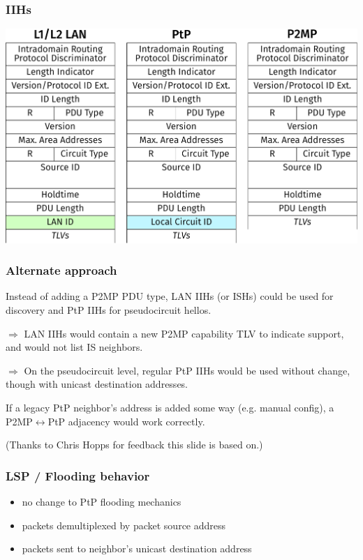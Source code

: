 \documentclass[12pt]{beamer}
\begin{document}
\begin{frame}
  \frametitle{IIHs}

  \includegraphics[scale=0.42,angle=0]{isis_93_p2mppdu.pdf}%
\end{frame}

\begin{frame}
  \frametitle{Alternate approach}

  Instead of adding a P2MP PDU type, LAN IIHs (or ISHs) could be used for
  discovery and PtP IIHs for pseudocircuit hellos.

  \vspace{3mm}

  $\Rightarrow$ LAN IIHs would contain a new P2MP capability TLV to indicate
  support, and would not list IS neighbors.

  \vspace{3mm}

  $\Rightarrow$ On the pseudocircuit level, regular PtP IIHs would be used
  without change, though with unicast destination addresses.

  \vspace{3mm}

  If a legacy PtP neighbor's address is added some way (e.g.
  manual config), a P2MP$\leftrightarrow$PtP adjacency would work correctly.

  \vspace{3mm}

  (Thanks to Chris Hopps for feedback this slide is based on.)

\end{frame}

\begin{frame}
  \frametitle{LSP / Flooding behavior}

  \begin{itemize}
    \item {\Large no change to PtP flooding mechanics}
    \item packets demultiplexed by packet source address
    \item packets sent to neighbor's unicast destination address
  \end{itemize}
\end{frame}
\end{document}
